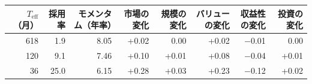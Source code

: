 \begin{tabular}{rrrrrrrr}
\toprule
$T_{\mathrm{eff}}$（月） & 採用率 & モメンタム（年率） & 市場の変化 & 規模の変化 & バリューの変化 & 収益性の変化 & 投資の変化 \\
\midrule
618 & 1.9 & 8.05 & +0.02 & 0.00 & +0.02 & \ensuremath{-}0.01 & 0.00 \\
120 & 9.1 & 7.46 & +0.10 & +0.01 & +0.08 & \ensuremath{-}0.04 & +0.01 \\
36 & 25.0 & 6.15 & +0.28 & +0.03 & +0.23 & \ensuremath{-}0.12 & +0.02 \\
\bottomrule
\end{tabular}
